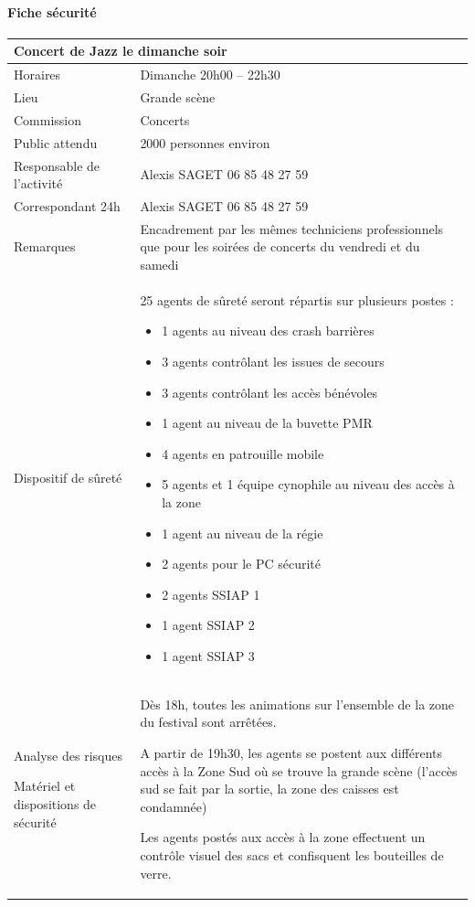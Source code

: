 \documentclass[hidelinks, paper=a4, fontsize=13pt]{report}
\begin{document}
\paragraph{Fiche sécurité}
\begin{center}
\begin{tabular}{ | p{6cm} | p{10cm} | }
\hline
	\multicolumn{2}{|l|}{Concert de Jazz le dimanche soir } \\ \hline
	Horaires & Dimanche  20h00 – 22h30 \\ \hline
	Lieu & Grande scène \\ \hline
	Commission & Concerts \\ \hline
	Public attendu & 2000 personnes environ \\ \hline
	Responsable de l'activité & Alexis SAGET 06 85 48 27 59 \\ \hline
	Correspondant 24h & Alexis SAGET 06 85 48 27 59  \\ \hline
	Remarques & Encadrement par les mêmes techniciens professionnels que pour les soirées de concerts du vendredi et du samedi \\ \hline
	Dispositif de sûreté & 25 agents de sûreté seront répartis sur plusieurs postes :
	\begin{itemize}
	\item 1 agents au niveau des crash barrières
	\item 3 agents contrôlant les issues de secours
	\item 3 agents contrôlant les accès bénévoles
	\item 1 agent au niveau de la buvette PMR
	\item 4 agents en patrouille mobile
	\item 5 agents et 1 équipe cynophile au niveau des accès à la zone
	\item 1 agent au niveau de la régie
	\item 2 agents pour le PC sécurité
	\item 2 agents SSIAP 1
	\item 1 agent SSIAP 2
	\item 1 agent SSIAP 3
	\end{itemize}
 \\ \hline
Analyse des risques

Matériel et dispositions de sécurité & Dès 18h, toutes les animations sur l’ensemble de la zone du festival sont arrêtées. 

A partir de 19h30, les agents se postent aux différents accès à la Zone Sud où se trouve la grande scène (l’accès sud se fait par la sortie, la zone des caisses est condamnée) 

Les agents postés aux accès à la zone effectuent un contrôle visuel des sacs et confisquent les bouteilles de verre. 

 \\ \hline
\end{tabular}

\end{center}
\end{document}
